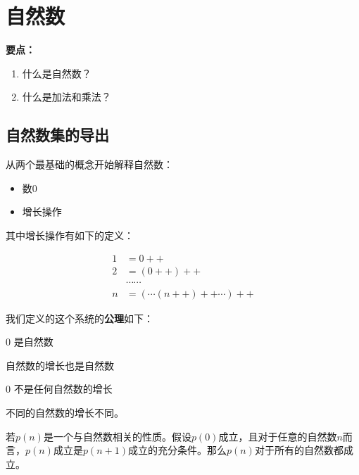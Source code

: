 \section{自然数}

\noindent\textbf{要点：}
\begin{enumerate}
	\item 什么是自然数？
	\item 什么是加法和乘法？
\end{enumerate}

\subsection{自然数集的导出}

从两个最基础的概念开始解释自然数：

\begin{itemize}
	\item 数$0$
	\item 增长操作
\end{itemize}

其中增长操作有如下的定义：

$$
\begin{aligned}
	1&=0++\\
	2&=(0++)++\\
	&\cdots\cdots\\
	n&=(\cdots(n++)++\cdots)++
\end{aligned}
$$

我们定义的这个系统的\textbf{公理}如下：

\begin{axiom}
	$0$ 是自然数
\end{axiom}

\begin{axiom}
	自然数的增长也是自然数
\end{axiom}

\begin{axiom}
	$0$ 不是任何自然数的增长
\end{axiom}

\begin{axiom}
	不同的自然数的增长不同。
\end{axiom}

\begin{axiom}[归纳原理]\label{thm:Induct-Axiom}
	若$p(n)$是一个与自然数相关的性质。假设$p(0)$成立，且对于任意的自然数$n$而言，$p(n)$成立是$p(n+1)$成立的充分条件。那么$p(n)$对于所有的自然数都成立。
\end{axiom}



